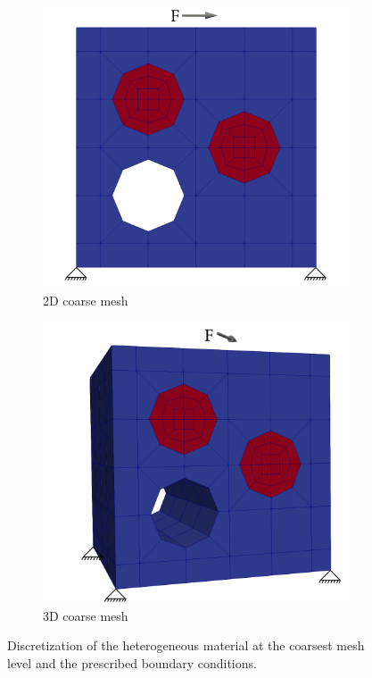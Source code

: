\documentclass[times,doublespace]{nmeauth}
\begin{document}
\begin{figure}[!ht]
  \centering
  \begin{subfigure}[b]{0.45\textwidth}
      \centering
      \includegraphics[width=\textwidth]{coarse_mesh.png}
      \caption{2D coarse mesh}
  \end{subfigure}
  \begin{subfigure}[b]{0.45\textwidth}
    \centering
    \includegraphics[width=\textwidth]{coarse_mesh_3d.png}
    \caption{3D coarse mesh}
  \end{subfigure}
  \caption{Discretization of the heterogeneous material at the coarsest mesh level and the prescribed boundary conditions.}%
  \label{fig:miehe}
\end{figure}
\end{document}
